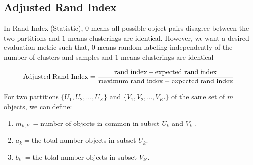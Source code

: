 \documentclass[11pt]{elegantbook}
\begin{document}
\subsection{Adjusted Rand Index}
In Rand Index (Statistic), $0$ means all possible object pairs disagree between the two partitions and $1$ means clusterings are identical. However, we want a desired evaluation metric such that, $0$ means random labeling independently of the number of clusters and samples and $1$ means clusterings are identical

\begin{definition}
    \begin{equation}
        \begin{aligned}
            \textnormal{Adjusted Rand Index}=\frac{\textnormal{rand index}-\textnormal{expected rand index}}{\textnormal{maximum rand index}-\textnormal{expected rand index}}
        \end{aligned}
        \nonumber
    \end{equation}
\end{definition}
For two partitions $\{U_1,U_2,...,U_K\}$ and $\{V_1,V_2,...,V_{K'}\}$ of the same set of $m$ objects, we can define:
\begin{enumerate}
    \item $m_{k,k'}=$number of objects in common in subset $U_k$ and $V_{k'}$.
    \item $a_k=$the total number objects in subset $U_k$.
    \item $b_{k'}=$the total number objects in subset $V_{k'}$.
\end{enumerate}
\end{document}
